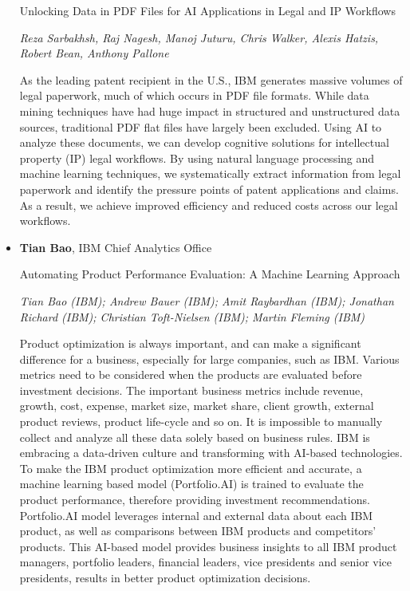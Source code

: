 \begin{itemize}
Unlocking Data in PDF Files for AI Applications in Legal and IP Workflows

\emph{\footnotesize Reza Sarbakhsh, Raj Nagesh, Manoj Juturu, Chris Walker, Alexis Hatzis, Robert Bean, Anthony Pallone}

As the leading patent recipient in the U.S., IBM generates massive volumes of legal paperwork, much of which occurs in PDF file formats. While data mining techniques have had huge impact in structured and unstructured data sources, traditional PDF flat files have largely been excluded. Using AI to analyze these documents, we can develop cognitive solutions for intellectual property (IP) legal workflows. By using natural language processing and machine learning techniques, we systematically extract information from legal paperwork and identify the pressure points of patent applications and claims. As a result, we achieve improved efficiency and reduced costs across our legal workflows.

\item \textbf{Tian Bao}, IBM Chief Analytics Office

Automating Product Performance Evaluation: A Machine Learning Approach

\emph{\footnotesize Tian Bao (IBM); Andrew Bauer (IBM); Amit Raybardhan (IBM); Jonathan Richard (IBM); Christian Toft-Nielsen (IBM); Martin Fleming (IBM)}

Product optimization is always important, and can make a significant difference for a business, especially for large companies, such as IBM. Various metrics need to be considered when the products are evaluated before investment decisions. The important business metrics include revenue, growth, cost, expense, market size, market share, client growth, external product reviews, product life-cycle and so on. It is impossible to manually collect and analyze all these data solely based on business rules. IBM is embracing a data-driven culture and transforming with AI-based technologies. To make the IBM product optimization more efficient and accurate, a machine learning based model (Portfolio.AI) is trained to evaluate the product performance, therefore providing investment recommendations. Portfolio.AI model leverages internal and external data about each IBM product, as well as comparisons between IBM products and competitors’ products. This AI-based model provides business insights to all IBM product managers, portfolio leaders, financial leaders, vice presidents and senior vice presidents, results in better product optimization decisions.

\end{itemize}

